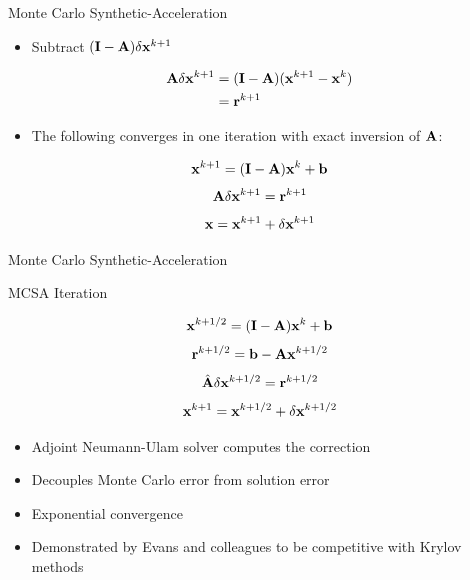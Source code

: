 \documentclass{beamer}
\begin{document}
\begin{frame}{Monte Carlo Synthetic-Acceleration}

  \begin{itemize}
  \item Subtract $(\mathbf{I} - \mathbf{A})\delta \mathbf{x}^{k+1}$
  \end{itemize}

  \[
  \begin{split}
    \mathbf{A}\delta \mathbf{x}^{k+1} &= (\mathbf{I} -
    \mathbf{A})(\mathbf{x}^{k+1}-\mathbf{x}^{k}) \\ &= \mathbf{r}^{k+1}
  \end{split}
  \]

  \begin{itemize}
  \item The following converges in one iteration with exact inversion
    of $\mathbf{A}$:
  \end{itemize}

  \[
  \mathbf{x}^{k+1} = (\mathbf{I} - \mathbf{A})\mathbf{x}^k + \mathbf{b}
  \]
  \[
  \mathbf{A} \delta \mathbf{x}^{k+1} = \mathbf{r}^{k+1}
  \]
  \[
  \mathbf{x} = \mathbf{x}^{k+1} + \delta \mathbf{x}^{k+1}
  \]

\end{frame}

\begin{frame}{Monte Carlo Synthetic-Acceleration}

  \begin{beamerboxesrounded}[upper=boxheadcolor,lower=boxbodycolor,shadow=true]
    {MCSA Iteration}

    \[
    \mathbf{x}^{k+1/2} = (\mathbf{I} - \mathbf{A})\mathbf{x}^k + \mathbf{b}
    \]
    \[
    \mathbf{r}^{k+1/2} = \mathbf{b} - \mathbf{A}\mathbf{x}^{k+1/2}
    \]
    \[
    \hat{\mathbf{A}}\delta\mathbf{x}^{k+1/2} = \mathbf{r}^{k+1/2}
    \]
    \[
    \mathbf{x}^{k+1} = \mathbf{x}^{k+1/2} + \delta \mathbf{x}^{k+1/2}
    \]

  \end{beamerboxesrounded}

  \begin{itemize}
  \item Adjoint Neumann-Ulam solver computes the correction
  \item Decouples Monte Carlo error from solution error
  \item Exponential convergence
  \item Demonstrated by Evans and colleagues to be competitive with
    Krylov methods
  \end{itemize}

\end{frame}
\end{document}
